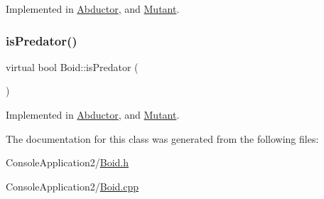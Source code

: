 Implemented in \hyperlink{class_abductor_adb812ea046ef9fc984b5035c7fb6ce3f}{Abductor}, and \hyperlink{class_mutant_af26928fa19102fe5ebea774819c4c565}{Mutant}.

\hypertarget{class_boid_afdc731ff7d6b7f471c202c191c4abf77}{}\label{class_boid_afdc731ff7d6b7f471c202c191c4abf77} 
\subsubsection{\texorpdfstring{is\+Predator()}{isPredator()}}
{\footnotesize\ttfamily virtual bool Boid\+::is\+Predator (\begin{DoxyParamCaption}{ }\end{DoxyParamCaption})\hspace{0.3cm}{\ttfamily [pure virtual]}}



Implemented in \hyperlink{class_abductor_ab862b53793f2722546e3e1be05bd546e}{Abductor}, and \hyperlink{class_mutant_a3416c1b42eb1e02bdcd4066109a28812}{Mutant}.



The documentation for this class was generated from the following files\+:\begin{DoxyCompactItemize}
\item 
Console\+Application2/\hyperlink{_boid_8h}{Boid.\+h}\item 
Console\+Application2/\hyperlink{_boid_8cpp}{Boid.\+cpp}\end{DoxyCompactItemize}
